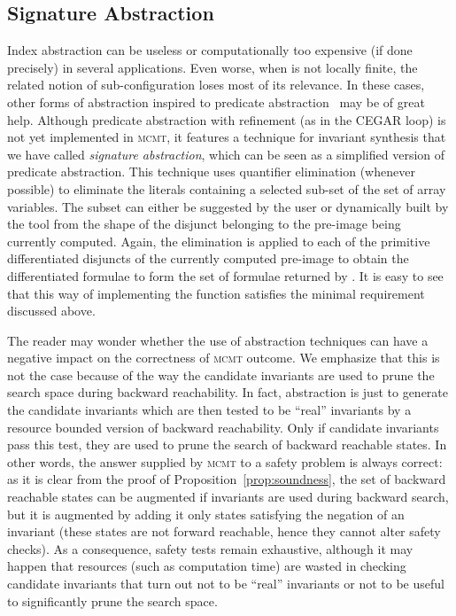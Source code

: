 \documentclass{LMCS}
\theoremstyle{plain}\newtheorem{assumption}[thm]{Assumption}
\theoremstyle{plain}\newtheorem{proposition}[thm]{Proposition}
\theoremstyle{plain}\newtheorem{property}[thm]{Property}
\theoremstyle{plain}\newtheorem{example}[thm]{Example}
\theoremstyle{plain}\newtheorem{claim}[thm]{Claim}
\theoremstyle{plain}\newtheorem{lemma}[thm]{Lemma}
\begin{document}
\subsection{Signature Abstraction}
\label{subsec:abs-inv}
Index abstraction can be useless or computationally too expensive (if
done precisely) in several applications.  Even worse, when  is
not locally finite, the related notion of sub-configuration loses most
of its relevance.  In these cases, other forms of abstraction inspired
to predicate abstraction~\cite{seminal} may be of great help.
Although predicate abstraction with refinement (as in the CEGAR loop)
is not yet implemented in \textsc{mcmt}, it features a technique for
invariant synthesis that we have called \emph{signature abstraction},
which can be seen as a simplified version of predicate abstraction.
This technique uses quantifier elimination (whenever possible) to
eliminate the literals containing a selected sub-set  of the set of
array variables.  The subset  can either be suggested by the user
or dynamically built by the tool from the shape of the disjunct
belonging to the pre-image being currently computed.  Again, the
elimination is applied to each of the primitive differentiated
disjuncts of the currently computed pre-image  to obtain the
differentiated formulae to form the set of formulae returned by
.  It is easy to see that this way of implementing
the function  satisfies the minimal requirement
discussed above.
\begin{rem}
  \label{remr}
The reader may wonder whether the use of abstraction techniques can
  have a negative impact on the correctness of \textsc{mcmt} outcome.
We emphasize that this is not the case because of the way the
  candidate invariants are used to prune the search space during
  backward reachability.  In fact, abstraction is just to generate the
  candidate invariants which are then tested to be ``real'' invariants
  by a resource bounded version of backward reachability.  Only if
  candidate invariants pass this test, they are used to prune the
  search of backward reachable states.  In other words, the answer
  supplied by \textsc{mcmt} to a safety problem is always correct: as
  it is clear from the proof of Proposition~\ref{prop:soundness}, the
  set of backward reachable states can be augmented if invariants are
  used during backward search, but it is augmented by adding it only
  states satisfying the negation of an invariant (these states are not
  forward reachable, hence they cannot alter safety checks). As a
  consequence, safety tests remain exhaustive,
although it may happen that resources (such as computation
  time) are wasted in checking candidate invariants that turn out not
  to be ``real'' invariants
or not to be useful to significantly  prune the search space.
\end{rem}
\end{document}
